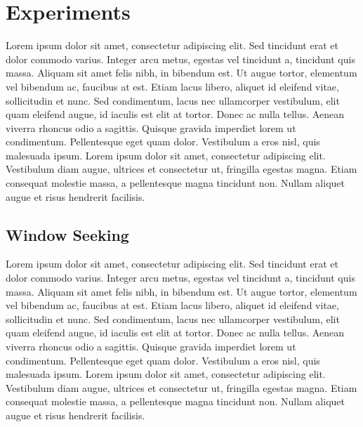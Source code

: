 \documentclass[letterpaper, 10 pt, conference]{ieeeconf}
\begin{document}

\section{Experiments}
Lorem ipsum dolor sit amet, consectetur adipiscing elit. Sed tincidunt erat et dolor commodo varius. Integer arcu metus, egestas vel tincidunt a, tincidunt quis massa. Aliquam sit amet felis nibh, in bibendum est. Ut augue tortor, elementum vel bibendum ac, faucibus at est. Etiam lacus libero, aliquet id eleifend vitae, sollicitudin et nunc. Sed condimentum, lacus nec ullamcorper vestibulum, elit quam eleifend augue, id iaculis est elit at tortor. Donec ac nulla tellus. Aenean viverra rhoncus odio a sagittis. Quisque gravida imperdiet lorem ut condimentum. Pellentesque eget quam dolor. Vestibulum a eros nisl, quis malesuada ipsum. Lorem ipsum dolor sit amet, consectetur adipiscing elit. Vestibulum diam augue, ultrices et consectetur ut, fringilla egestas magna. Etiam consequat molestie massa, a pellentesque magna tincidunt non. Nullam aliquet augue et risus hendrerit facilisis.

\subsection{Window Seeking}
Lorem ipsum dolor sit amet, consectetur adipiscing elit. Sed tincidunt erat et dolor commodo varius. Integer arcu metus, egestas vel tincidunt a, tincidunt quis massa. Aliquam sit amet felis nibh, in bibendum est. Ut augue tortor, elementum vel bibendum ac, faucibus at est. Etiam lacus libero, aliquet id eleifend vitae, sollicitudin et nunc. Sed condimentum, lacus nec ullamcorper vestibulum, elit quam eleifend augue, id iaculis est elit at tortor. Donec ac nulla tellus. Aenean viverra rhoncus odio a sagittis. Quisque gravida imperdiet lorem ut condimentum. Pellentesque eget quam dolor. Vestibulum a eros nisl, quis malesuada ipsum. Lorem ipsum dolor sit amet, consectetur adipiscing elit. Vestibulum diam augue, ultrices et consectetur ut, fringilla egestas magna. Etiam consequat molestie massa, a pellentesque magna tincidunt non. Nullam aliquet augue et risus hendrerit facilisis.

\end{document}
